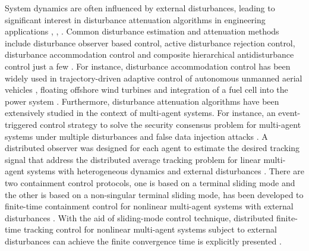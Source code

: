 \documentclass[lettersize,journal]{IEEEtran}
\begin{document}
System dynamics are often influenced by external disturbances, leading to significant interest in disturbance attenuation algorithms in engineering applications \cite{7265050}, \cite{xie2000much}, \cite{li2014disturbance}. Common disturbance estimation and attenuation methods include disturbance observer based control, active disturbance rejection control, disturbance accommodation control and composite hierarchical antidisturbance control just a few \cite{7265050}.
For instance, disturbance accommodation control has been widely used in trajectory-driven adaptive control of autonomous unmanned aerial vehicles \cite{prabhakar2018trajectory}, floating offshore wind turbines \cite{namik2009disturbance} and integration of a fuel cell into the power system \cite{paradkar2004integration}.
Furthermore, disturbance attenuation algorithms have been extensively studied in the context of multi-agent systems.
For instance, an event-triggered control strategy to solve the security consensus problem for multi-agent systems under multiple disturbances and false data injection attacks \cite{9745491}. A distributed observer was designed for each agent to estimate the desired tracking signal that address the distributed average tracking problem for linear multi-agent systems with heterogeneous dynamics and external disturbances \cite{9547799}. There are two containment control protocols, one is based on a terminal sliding mode and  the other is based on a non-singular terminal sliding mode, has been developed to finite-time containment control for nonlinear multi-agent systems with external disturbances \cite{LU2020338}. With the aid of sliding-mode control technique, distributed finite-time tracking control for nonlinear multi-agent systems subject to external disturbances can achieve  the finite convergence time is explicitly presented \cite{zhang2013distributed}.
\end{document}
